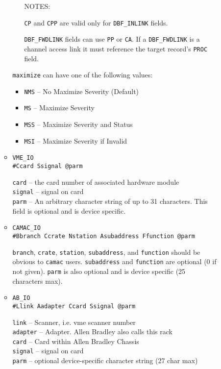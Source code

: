 \begin{description}
\begin{itemize}
\begin{itemize}
\begin{itemize}
NOTES:

\verb|CP| and \verb|CPP| are valid only for \verb|DBF_INLINK| fields.

\verb|DBF_FWDLINK| fields can use \verb|PP| or \verb|CA|.
If a \verb|DBF_FWDLINK| is a channel access link it must reference the target record's \verb|PROC| field.
\end{itemize}

\verb|maximize| can have one of the following values:

\begin{itemize}
\item \verb|NMS| -- No Maximize Severity (Default)
\item \verb|MS| -- Maximize Severity
\item \verb|MSS| -- Maximize Severity and Status
\item \verb|MSI| -- Maximize Severity if Invalid
\end{itemize}

\item \verb|VME_IO| \\
\verb|#Ccard Ssignal @parm|

\verb|card| -- the card number of associated hardware module \\
\verb|signal| -- signal on card \\
\verb|parm| -- An arbitrary character string of up to 31 characters. This field is optional and is device specific.

\item \verb|CAMAC_IO| \\
\verb|#Bbranch Ccrate Nstation Asubaddress Ffunction @parm|

\verb|branch|, \verb|crate|, \verb|station|, \verb|subaddress|, and \verb|function| should be obvious to \verb|camac| users.
\verb|subaddress| and \verb|function| are optional (0 if not given).
\verb|parm| is also optional and is device specific (25 characters max).

\item \verb|AB_IO| \\
\verb|#Llink Aadapter Ccard Ssignal @parm|

\verb|link| -- Scanner, i.e. vme scanner number \\
\verb|adapter| -- Adapter. Allen Bradley also calls this rack \\
\verb|card| -- Card within Allen Bradley Chassis \\
\verb|signal| -- signal on card \\
\verb|parm| -- optional device-specific character string (27 char max)


\end{itemize}
\end{itemize}
\end{description}

